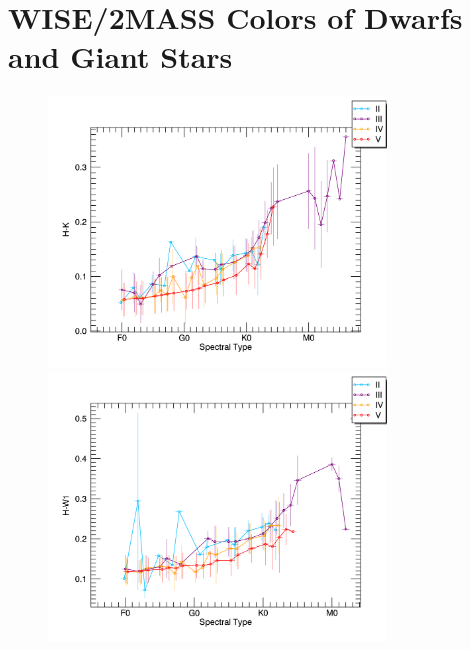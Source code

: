 \chapter{WISE/2MASS Colors of Dwarfs and Giant Stars}\label{Appendix:2}

\begin{figure}
\centering
\begin{minipage}[b]{\textwidth}
    \includegraphics[width=0.8\textwidth,clip=true]{Figures/subtype_bar/SPT_H-K.png}
\end{minipage}\qquad
\begin{minipage}[b]{\textwidth}
    \includegraphics[width=0.8\textwidth,clip=true]{Figures/subtype_bar/SPT_H-W1.png}
\end{minipage}
\end{figure}